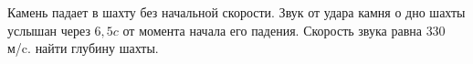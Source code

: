 Камень падает в шахту без начальной скорости.
Звук от удара камня о дно шахты услышан через $6,5c$ от момента начала его падения.
Скорость звука равна $330$ м/c. найти глубину шахты.
 
